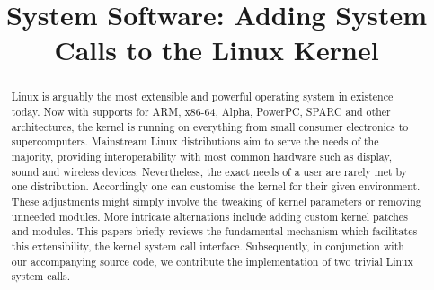 \documentclass{article}
\title{System Software: Adding System Calls to the Linux Kernel}
\begin{document}
\maketitle

\begin{abstract}
Linux is arguably the most extensible and powerful operating system in existence today. 
Now with supports for ARM, x86-64, Alpha, PowerPC, SPARC and other architectures, 
the kernel is running on everything from small consumer electronics to supercomputers.
Mainstream Linux distributions aim to serve the needs of the majority, providing
interoperability with most common hardware such as display, sound and wireless devices.
Nevertheless, the exact needs of a user are rarely met by one distribution.
Accordingly one can customise the kernel for their given environment.
These adjustments might simply involve the tweaking of kernel parameters or removing
unneeded modules. More intricate alternations include adding custom 
kernel patches and modules. 
This papers briefly reviews the 
fundamental mechanism which facilitates this
extensibility, the kernel system call interface. Subsequently, in conjunction 
with our accompanying source code, we contribute the implementation of two trivial Linux system
calls.
\end{abstract}
\end{document}
